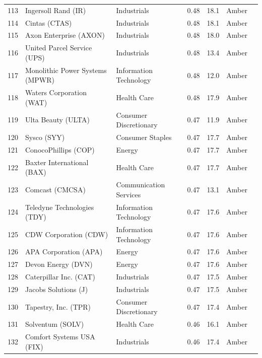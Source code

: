 \documentclass[11pt,a4paper]{article}
\begin{document}
{\begin{longtable}{r p{4.4cm} p{2.8cm} r r l l}
113 & Ingersoll Rand (IR) & Industrials & 0.48 & 18.1 & \cellcolor[HTML]{FFEB9C}Amber &  \\
114 & Cintas (CTAS) & Industrials & 0.48 & 18.1 & \cellcolor[HTML]{FFEB9C}Amber &  \\
115 & Axon Enterprise (AXON) & Industrials & 0.48 & 18.0 & \cellcolor[HTML]{FFEB9C}Amber &  \\
116 & United Parcel Service (UPS) & Industrials & 0.48 & 13.4 & \cellcolor[HTML]{FFEB9C}Amber &  \\
117 & Monolithic Power Systems (MPWR) & Information Technology & 0.48 & 12.0 & \cellcolor[HTML]{FFEB9C}Amber &  \\
118 & Waters Corporation (WAT) & Health Care & 0.48 & 17.9 & \cellcolor[HTML]{FFEB9C}Amber &  \\
119 & Ulta Beauty (ULTA) & Consumer Discretionary & 0.47 & 11.9 & \cellcolor[HTML]{FFEB9C}Amber &  \\
120 & Sysco (SYY) & Consumer Staples & 0.47 & 17.7 & \cellcolor[HTML]{FFEB9C}Amber &  \\
121 & ConocoPhillips (COP) & Energy & 0.47 & 17.7 & \cellcolor[HTML]{FFEB9C}Amber &  \\
122 & Baxter International (BAX) & Health Care & 0.47 & 17.7 & \cellcolor[HTML]{FFEB9C}Amber &  \\
123 & Comcast (CMCSA) & Communication Services & 0.47 & 13.1 & \cellcolor[HTML]{FFEB9C}Amber &  \\
124 & Teledyne Technologies (TDY) & Information Technology & 0.47 & 17.6 & \cellcolor[HTML]{FFEB9C}Amber &  \\
125 & CDW Corporation (CDW) & Information Technology & 0.47 & 17.6 & \cellcolor[HTML]{FFEB9C}Amber &  \\
126 & APA Corporation (APA) & Energy & 0.47 & 17.6 & \cellcolor[HTML]{FFEB9C}Amber &  \\
127 & Devon Energy (DVN) & Energy & 0.47 & 17.6 & \cellcolor[HTML]{FFEB9C}Amber &  \\
128 & Caterpillar Inc. (CAT) & Industrials & 0.47 & 17.5 & \cellcolor[HTML]{FFEB9C}Amber &  \\
129 & Jacobs Solutions (J) & Industrials & 0.47 & 17.5 & \cellcolor[HTML]{FFEB9C}Amber &  \\
130 & Tapestry, Inc. (TPR) & Consumer Discretionary & 0.47 & 17.4 & \cellcolor[HTML]{FFEB9C}Amber &  \\
131 & Solventum (SOLV) & Health Care & 0.46 & 16.1 & \cellcolor[HTML]{FFEB9C}Amber &  \\
132 & Comfort Systems USA (FIX) & Industrials & 0.46 & 17.4 & \cellcolor[HTML]{FFEB9C}Amber &  \\

\end{longtable}}
\end{document}
